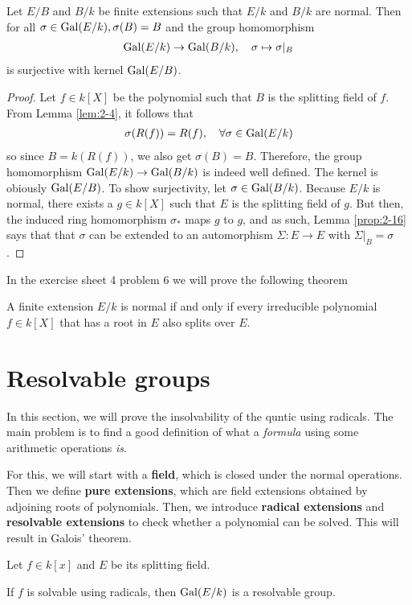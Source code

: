 \begin{thm}[]\label{thm:surhom}
  Let $E/B$ and $B/k$ be finite extensions such that $E/k$ and $B/k$ are normal.
  Then for all $\sigma \in \operatorname{Gal}(E/k), \sigma(B) = B$ and the group homomorphism
  \begin{align*}
    \operatorname{Gal}(E/k) \to \operatorname{Gal}(B/k), \quad \sigma \mapsto \sigma|_B
  \end{align*}
  is surjective with kernel $\operatorname{Gal}(E/B)$.
\end{thm}
\begin{proof}
  Let $f \in k[X]$ be the polynomial such that $B$ is the splitting field of $f$.
  From Lemma \ref{lem:2-4}, it follows that
  \begin{align*}
    \sigma(R(f)) = R(f), \quad \forall \sigma \in \operatorname{Gal}(E/k)
  \end{align*}
  so since $B = k(R(f))$, we also get $\sigma(B) = B$. Therefore, the group homomorphism $\operatorname{Gal}(E/k) \to  \operatorname{Gal}(B/k)$ is indeed well defined.
  The kernel is obiously $\operatorname{Gal}(E/B)$.
  To show surjectivity, let $\sigma \in \operatorname{Gal}(B/k)$. 
  Because $E/k$ is normal, there exists a $g \in k[X]$ such that $E$ is the splitting field of $g$.
  But then, the induced ring homomorphism $\sigma_{\ast}$ maps $g$ to $g$, and as such, Lemma \ref{prop:2-16} says that that $\sigma$ can be extended to an automorphism $\Sigma: E \to  E$ with $\Sigma|_{B} = \sigma$.
\end{proof}

In the exercise sheet 4 problem 6 we will prove the following theorem

\begin{thm}[]
  A finite extension $E/k$ is normal if and only if every irreducible polynomial $f \in k[X]$ that has a root in $E$ also splits over $E$.
\end{thm}
 
\section{Resolvable groups}
In this section, we will prove the insolvability of the quntic using radicals.
The main problem is to find a good definition of what a \emph{formula} using some arithmetic operations \emph{is}.

For this, we will start with a \textbf{field}, which is closed under the normal operations. 
Then we define \textbf{pure extensions}, which are field extensions obtained by adjoining roots of polynomials.
Then, we introduce \textbf{radical extensions} and \textbf{resolvable extensions} to check whether a polynomial can be solved.
This will result in Galois' theorem.
\begin{thm*}[Galois]
  Let $f \in k[x]$ and $E$ be its splitting field.

  If $f$ is solvable using radicals, then $\operatorname{Gal}(E/k)$ is a resolvable group.
\end{thm*}

